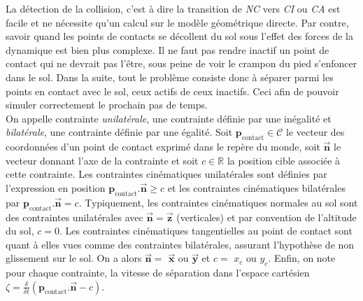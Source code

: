 La détection de la collision, c'est à dire la transition de \textit{NC} vers \textit{CI}
ou \textit{CA} est facile et ne nécessite qu'un calcul sur le modèle géométrique directe.
Par contre, savoir quand les points de contacts se \og décollent \fg du sol sous
l'effet des forces de la dynamique est bien plus complexe.
Il ne faut pas rendre inactif un point de contact qui ne devrait pas 
l'être, sous peine de voir le crampon du pied s'enfoncer dans le sol.
Dans la suite, tout le problème consiste donc à séparer parmi les points 
en contact avec le sol, ceux actifs de ceux inactifs.
Ceci afin de pouvoir simuler correctement le prochain pas de temps.\\

On appelle contrainte \textit{unilatérale}, une contrainte définie 
par une inégalité et \textit{bilatérale}, une contrainte définie 
par une égalité.
Soit $\bm{p}_{\text{contact}} \in \mathscr{C}$ le vecteur des coordonnées 
d'un point de contact exprimé dans le repère du monde, 
soit $\bm{\vec{n}}$ le vecteur donnant
l'axe de la contrainte et soit $c \in \mathbb{R}$ la position 
cible associée à cette contrainte.
Les contraintes cinématiques unilatérales sont définies par l'expression 
en position $\bm{p}_{\text{contact}}.\bm{\vec{n}} \geqslant c$ et les 
contraintes cinématiques bilatérales par $\bm{p}_{\text{contact}}.\bm{\vec{n}} = c$.
Typiquement, les contraintes cinématiques normales au sol 
sont des contraintes unilatérales avec $\bm{\vec{n}} = \bm{\vec{z}}$ (verticales)
et par convention de l'altitude du sol, $c = 0$.
Les contraintes cinématiques tangentielles au point de contact 
sont quant à elles vues comme des contraintes bilatérales, 
assurant l'hypothèse de non glissement sur le sol.
On a alors $\bm{\vec{n}} = $ $\bm{\vec{x}}$ ou $\bm{\vec{y}}$ 
et $c = $ $x_{c}$ ou $y_{c}$.
Enfin, on note pour chaque contrainte, la vitesse de séparation dans l'espace 
cartésien $\zeta = \frac{\delta}{\delta t} (\bm{p}_{\text{contact}}.\bm{\vec{n}} - c)$.\\

